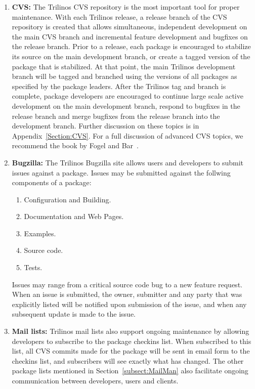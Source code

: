 \documentclass[12pt,relax]{TrilinosDevGuide}
\begin{document}
\begin{enumerate}
\item {\bf CVS:} The Trilinos CVS repository is the most important
tool for proper maintenance.  With each Trilinos release, a release
branch of the CVS repository is
created  that allows simultaneous, independent development on the main
CVS branch and incremental feature development and
bugfixes on the release branch.  Prior to a release, each package is
encouraged to stabilize its source on the main development branch, or
create a tagged version of the package that is stabilized.  At that
point, the main Trilinos development branch will be tagged and
branched using the versions of all packages as specified by the
package leaders.  After the Trilinos tag and branch is complete, 
package developers are encouraged to continue large scale active
development on the main development branch, respond to bugfixes in the
release branch and merge bugfixes from the release branch into the
development branch.  Further discussion on these topics is in 
Appendix~\ref{Section:CVS}.  For a full discussion of advanced CVS
topics, we recommend the book by Fogel and Bar~\cite{FogelBarCVS}.

\item {\bf Bugzilla:} The Trilinos Bugzilla site
allows users and developers to submit issues against a package.
Issues may be submitted against the follwing components of a package:
\begin{enumerate}
\item Configuration and Building.
\item Documentation and Web Pages.
\item Examples.
\item Source code.
\item Tests.
\end{enumerate}
Issues may range from a critical source code bug to a new feature
request.  When an issue is submitted, the owner, submitter and any
party that was explicitly listed will be notified upon submission of
the issue, and when any subsequent update is made to the issue.

\item {\bf Mail lists:} 
Trilinos mail lists also support ongoing maintenance by allowing
developers to subscribe to the package checkins list.  When subscribed
to this list, all CVS commits made for the package will be sent in
email form to the checkins list, and subscribers will see exactly what
has changed. The other package lists mentioned in 
Section~\ref{subsect:MailMan} also facilitate ongoing
communication between developers, users and clients.


\end{enumerate}
\end{document}
